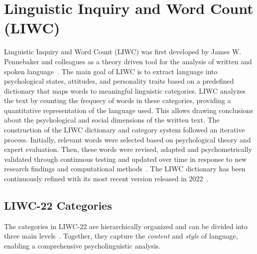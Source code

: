\section{Linguistic Inquiry and Word Count (LIWC)}
Linguistic Inquiry and Word Count (LIWC) was first developed by James W. Pennebaker and colleagues as a theory driven tool for the analysis of written and spoken language~\cite{tausczik2010psychological}. 
The main goal of LIWC is to extract language into psychological states, attitudes, and personality traits based on a predefined dictionary that maps words to meaningful linguistic categories. LIWC analyzes the text by counting the frequecy of words in these categories, providing a quantitative representation of the language used. This allows drawing conclusions about the psychological and social dimensions of the written text.
The construction of the LIWC dictionary and category system followed an iterative process. Initially, relevant words were selected based on psychological theory and expert evaluation. Then, these words were revised, adapted and psychometrically validated through continuous testing and updated over time in response to new research findings and computational methods~\cite{tausczik2010psychological}. The LIWC dictionary has been continuously refined with its most recent version released in 2022~\cite{pennebaker2022liwc}.


\subsection{LIWC-22 Categories}

The categories in LIWC-22 are hierarchically organized and can be divided into three main levels~\cite{pennebaker2022liwc,tausczik2010psychological}. Together, they capture the \textit{content} and \textit{style} of language, enabling a comprehensive psycholinguistic analysis.

